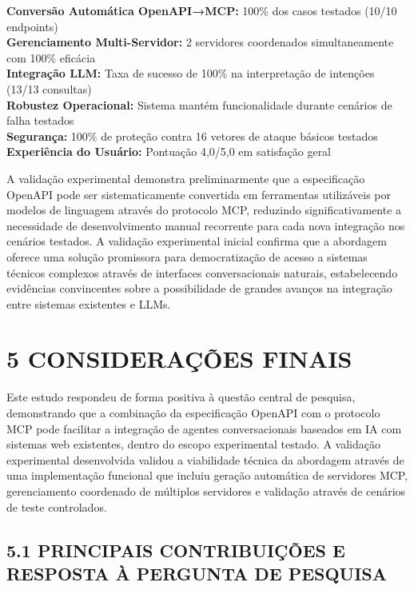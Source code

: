 \documentclass[
]{article}
\begin{document}
\textbf{Conversão Automática OpenAPI→MCP:} 100\% dos casos testados
(10/10 endpoints)\\
\textbf{Gerenciamento Multi-Servidor:} 2 servidores coordenados
simultaneamente com 100\% eficácia\\
\textbf{Integração LLM:} Taxa de sucesso de 100\% na interpretação de
intenções (13/13 consultas)\\
\textbf{Robustez Operacional:} Sistema mantém funcionalidade durante
cenários de falha testados\\
\textbf{Segurança:} 100\% de proteção contra 16 vetores de ataque
básicos testados\\
\textbf{Experiência do Usuário:} Pontuação 4,0/5,0 em satisfação geral

A validação experimental demonstra preliminarmente que a especificação
OpenAPI pode ser sistematicamente convertida em ferramentas utilizáveis
por modelos de linguagem através do protocolo MCP, reduzindo
significativamente a necessidade de desenvolvimento manual recorrente
para cada nova integração nos cenários testados. A validação
experimental inicial confirma que a abordagem oferece uma solução
promissora para democratização de acesso a sistemas técnicos complexos
através de interfaces conversacionais naturais, estabelecendo evidências
convincentes sobre a possibilidade de grandes avanços na integração
entre sistemas existentes e LLMs.

\section{5 CONSIDERAÇÕES FINAIS}\label{considerauxe7uxf5es-finais}

Este estudo respondeu de forma positiva à questão central de pesquisa,
demonstrando que a combinação da especificação OpenAPI com o protocolo
MCP pode facilitar a integração de agentes conversacionais baseados em
IA com sistemas web existentes, dentro do escopo experimental testado. A
validação experimental desenvolvida validou a viabilidade técnica da
abordagem através de uma implementação funcional que incluiu geração
automática de servidores MCP, gerenciamento coordenado de múltiplos
servidores e validação através de cenários de teste controlados.

\subsection{5.1 PRINCIPAIS CONTRIBUIÇÕES E RESPOSTA À PERGUNTA DE
PESQUISA}\label{principais-contribuiuxe7uxf5es-e-resposta-uxe0-pergunta-de-pesquisa}
\end{document}
